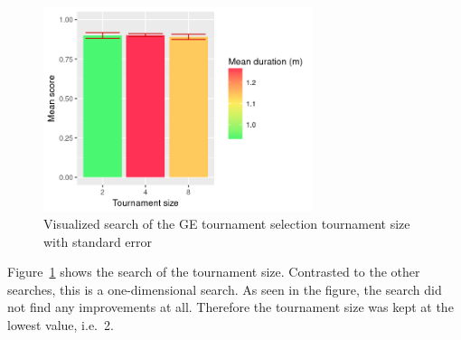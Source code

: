 \begin{figure}
    \centering
    \includegraphics[width=0.7\textwidth]{figures/ge-tournament-sampling}
    \caption[Visualized search of the GE tournament selection tournament size]{Visualized search of the \gls{GE} tournament selection tournament size with standard error}
    \label{fig:tournament-sampling}
\end{figure}

Figure~\ref{fig:tournament-sampling} shows the search of the tournament size.
Contrasted to the other searches, this is a one-dimensional search.
As seen in the figure, the search did not find any improvements at all.
Therefore the tournament size was kept at the lowest value, i.e.\ 2.

